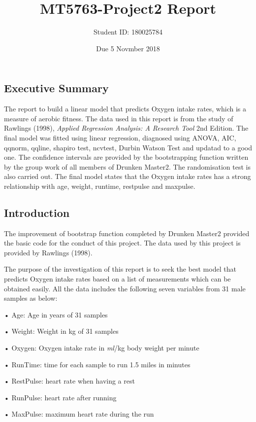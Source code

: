 \documentclass[]{article}
\title{MT5763-Project2 Report}
\author{Student ID: 180025784}
\date{Due 5 Novmber 2018}
\begin{document}
\maketitle

{
\setcounter{tocdepth}{3}
\tableofcontents
}
\subsection{Executive Summary}\label{executive-summary}

The report to build a linear model that predicts Oxygen intake rates,
which is a measure of aerobic fitness. The data used in this report is
from the study of Rawlings (1998), \emph{Applied Regression Analysis: A
Research Tool} 2nd Edition. The final model was fitted using linear
regression, diagnosed using ANOVA, AIC, qqnorm, qqline, shapiro test,
ncvtest, Durbin Watson Test and updatad to a good one. The confidence
intervals are provided by the bootstrapping function written by the
group work of all members of Drunken Master2. The randomisation test is
also carried out. The final model states that the Oxygen intake rates
has a strong relationship with age, weight, runtime, restpulse and
maxpulse. \pagebreak

\subsection{Introduction}\label{introduction}

The improvement of bootstrap function completed by Drunken Master2
provided the basic code for the conduct of this project. The data used
by this project is provided by Rawlings (1998).

The purpose of the investigation of this report is to seek the best
model that predicts Oxygen intake rates based on a list of measurements
which can be obtained easily. All the data includes the following seven
variables from 31 male samples as below:

• Age: Age in years of 31 samples

• Weight: Weight in kg of 31 samples

• Oxygen: Oxygen intake rate in \emph{ml}/kg body weight per minute

• RunTime: time for each sample to run 1.5 miles in minutes

• RestPulse: heart rate when having a rest

• RunPulse: heart rate after running

• MaxPulse: maximum heart rate during the run
\end{document}

